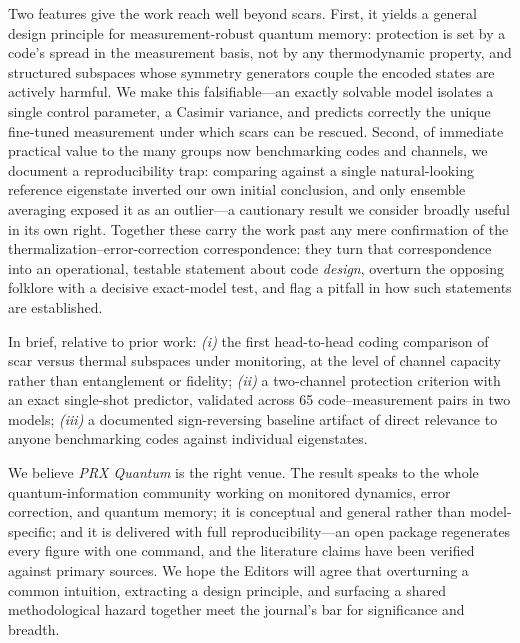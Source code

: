 \documentclass[11pt]{article}
\begin{document}
Two features give the work reach well beyond scars. First, it yields a general
design principle for measurement-robust quantum memory: protection is set by a
code's spread in the measurement basis, not by any thermodynamic property, and
structured subspaces whose symmetry generators couple the encoded states are
actively harmful. We make this falsifiable---an exactly solvable model isolates a
single control parameter, a Casimir variance, and predicts correctly the unique
fine-tuned measurement under which scars can be rescued. Second, of immediate
practical value to the many groups now benchmarking codes and channels, we
document a reproducibility trap: comparing against a single natural-looking
reference eigenstate inverted our own initial conclusion, and only ensemble
averaging exposed it as an outlier---a cautionary result we consider broadly
useful in its own right. Together these carry the work past any mere confirmation
of the thermalization--error-correction correspondence: they turn that
correspondence into an operational, testable statement about code \emph{design},
overturn the opposing folklore with a decisive exact-model test, and flag a
pitfall in how such statements are established.

\noindent In brief, relative to prior work: \emph{(i)} the first head-to-head
coding comparison of scar versus thermal subspaces under monitoring, at the
level of channel capacity rather than entanglement or fidelity; \emph{(ii)} a
two-channel protection criterion with an exact single-shot predictor, validated
across 65 code--measurement pairs in two models; \emph{(iii)} a documented
sign-reversing baseline artifact of direct relevance to anyone benchmarking
codes against individual eigenstates.

\vspace{0.5em}

We believe \emph{PRX Quantum} is the right venue. The result speaks to the whole
quantum-information community working on monitored dynamics, error correction,
and quantum memory; it is conceptual and general rather than model-specific; and
it is delivered with full reproducibility---an open package regenerates every
figure with one command, and the literature claims have been verified against
primary sources. We hope the Editors will agree that overturning
a common intuition, extracting a design principle, and surfacing a shared
methodological hazard together meet the journal's bar for significance and
breadth.
\end{document}
